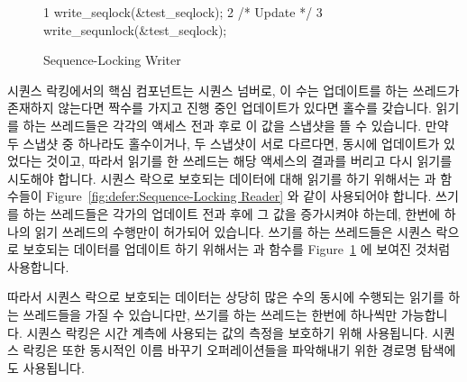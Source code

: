 \begin{figure}[bp]
{ \scriptsize
\begin{verbbox}
  1 write_seqlock(&test_seqlock);
  2 /* Update */
  3 write_sequnlock(&test_seqlock);
\end{verbbox}
}
\centering
\theverbbox
\caption{Sequence-Locking Writer}
\label{fig:defer:Sequence-Locking Writer}
\end{figure}

시퀀스 락킹에서의 핵심 컴포넌트는 시퀀스 넘버로, 이 수는 업데이트를 하는
쓰레드가 존재하지 않는다면 짝수를 가지고 진행 중인 업데이트가 있다면 홀수를
갖습니다.
읽기를 하는 쓰레드들은 각각의 액세스 전과 후로 이 값을 스냅샷을 뜰 수 있습니다.
만약 두 스냅샷 중 하나라도 홀수이거나, 두 스냅샷이 서로 다르다면, 동시에
업데이트가 있었다는 것이고, 따라서 읽기를 한 쓰레드는 해당 액세스의 결과를
버리고 다시 읽기를 시도해야 합니다.
시퀀스 락으로 보호되는 데이터에 대해 읽기를 하기 위해서는 
과  함수들이 Figure~\ref{fig:defer:Sequence-Locking Reader}
와 같이 사용되어야 합니다.
쓰기를 하는 쓰레드들은 각가의 업데이트 전과 후에 그 값을 증가시켜야 하는데,
한번에 하나의 읽기 쓰레드의 수행만이 허가되어 있습니다.
쓰기를 하는 쓰레드들은 시퀀스 락으로 보호되는 데이터를 업데이트 하기 위해서는
 과  함수를
Figure~\ref{fig:defer:Sequence-Locking Writer} 에 보여진 것처럼 사용합니다.

따라서 시퀀스 락으로 보호되는 데이터는 상당히 많은 수의 동시에 수행되는 읽기를
하는 쓰레드들을 가질 수 있습니다만, 쓰기를 하는 쓰레드는 한번에 하나씩만
가능합니다.
시퀀스 락킹은 시간 계측에 사용되는 값의 측정을 보호하기 위해 사용됩니다.
시퀀스 락킹은 또한 동시적인 이름 바꾸기 오퍼레이션들을 파악해내기 위한 경로명
탐색에도 사용됩니다.
\iffalse

